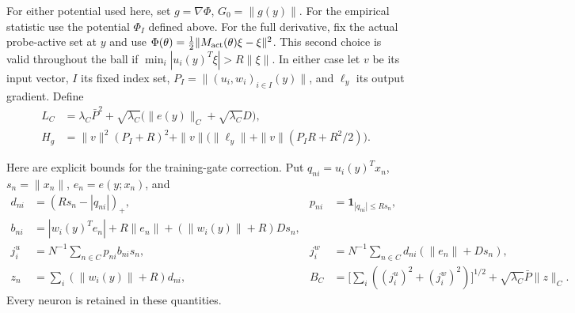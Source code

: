 \documentclass[10pt]{article}
\begin{document}
For either potential used here, set $g=\nabla\Phi$, $G_0=\|g(y)\|$.
For the empirical statistic use the potential $\Phi_I$ defined above. For the full derivative, fix the actual
probe-active set at $y$ and use
$\Phi(\theta)=\frac12\|M_{\rm act}(\theta)\xi-\xi\|^2$.
This second choice is valid throughout the ball if
$\min_i|u_i(y)^T\xi|>R\|\xi\|$.
In either case let $v$ be its input vector, $I$ its fixed index set,
$P_I=\|(u_i,w_i)_{i\in I}(y)\|$, and $\ell_y$ its output gradient.
Define
\begin{align*}
 L_C&=\lambda_C\bar P^2+
 \sqrt{\lambda_C}\big(\|e(y)\|_C+\sqrt{\lambda_C}D\big),\\
 H_g&=\|v\|^2(P_I+R)^2+
 \|v\|\big(\|\ell_y\|+\|v\|(P_IR+R^2/2)\big).
\end{align*}

Here are explicit bounds for the training-gate correction. Put
$q_{ni}=u_i(y)^Tx_n$, $s_n=\|x_n\|$, $e_n=e(y;x_n)$, and
\begin{align*}
 d_{ni}&=(Rs_n-|q_{ni}|)_+,&
 p_{ni}&=\mathbf1_{|q_{ni}|\le Rs_n},\\
 b_{ni}&=|w_i(y)^Te_n|+R\|e_n\|
                 +(\|w_i(y)\|+R)Ds_n,\\
 j_i^u&=N^{-1}\sum_{n\in C}p_{ni}b_{ni}s_n,&
 j_i^w&=N^{-1}\sum_{n\in C}d_{ni}(\|e_n\|+Ds_n),\\
 z_n&=\sum_i(\|w_i(y)\|+R)d_{ni},&
 B_C&=\Big[\sum_i((j_i^u)^2+(j_i^w)^2)\Big]^{1/2}
                  +\sqrt{\lambda_C}\bar P\|z\|_C.
\end{align*}
Every neuron is retained in these quantities.
\end{document}
